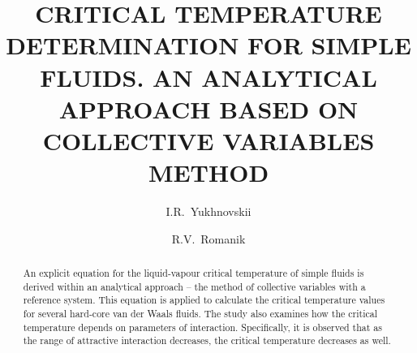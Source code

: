 \documentclass[fleqn,twoside,twocolumn,nofootinbib,showkeys]{revtex4} %
\begin{document}
\title[Critical temperature determination for simple fluids]%
{CRITICAL TEMPERATURE DETERMINATION FOR SIMPLE FLUIDS. AN ANALYTICAL APPROACH BASED ON COLLECTIVE VARIABLES METHOD}%
\author{I.R.~Yukhnovskii}%
\author{R.V.~Romanik}
\address{1, Svientsitskii Str., Lviv 79011, Ukraine}%


\razd{\secv}



\setcounter{page}{53}

\begin{abstract}
An explicit equation for the liquid-vapour critical temperature of simple fluids is derived within an analytical approach -- the method of collective variables with a reference system.
This equation is applied to calculate the critical temperature values for several hard-core van der Waals fluids. The study also examines how the critical temperature depends on parameters of interaction. Specifically, it is observed that as the range of attractive interaction decreases, the critical temperature decreases as well.
\end{abstract}


\maketitle











\appendix

\renewcommand{\theequation}{A.\arabic{equation}}
\setcounter{equation}{0}
\end{document}
